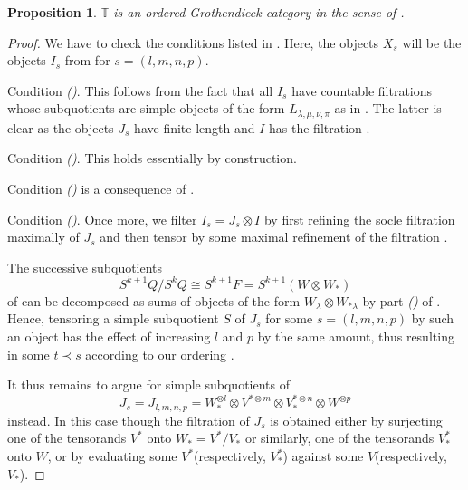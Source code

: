 \documentclass[11pt]{article}
\theoremstyle{plain}
\newtheorem{proposition}[lemma]{Proposition}
\theoremstyle{nonumberplain}
\theoremstyle{plain}
\numberwithin{equation}{section}
\theoremstyle{nonumberplain}
\newtheorem{proof}{Proof}
\newcommand\bT{{\mathbb T}}
\newcommand\cP{{\mathcal P}}
\newcommand\cS{{\mathcal S}}
\newcommand\1{{\bf 1}}
\begin{document}
\begin{proposition}\label{pr.is-ordered}
$\bT$ is an ordered Grothendieck category in the sense of .   
\end{proposition}
\begin{proof}
  We have to check the conditions listed in . Here, the objects $X_s$ will be the objects $I_s$ from  for $s=(l,m,n,p)$.

  {Condition \emph{()}.} This follows from the fact that all $I_s$ have countable filtrations whose subquotients are simple objects of the form $L_{\lambda,\mu,\nu,\pi}$ as in . The latter is clear as the objects $J_s$ have finite length and $I$ has the filtration .


  {Condition \emph{()}.} This holds essentially by construction. 

  {Condition \emph{()}} is a consequence of \cite[Proposition 4.4]{us0}.  

  {Condition \emph{()}.} Once more, we filter $I_s=J_s\otimes I$ by first refining the socle filtration maximally of $J_s$ and then tensor by some maximal refinement of the filtration . %

  The successive subquotients
  \begin{equation*}
    S^{k+1}Q/S^kQ \cong S^{k+1}F= S^{k+1}(W\otimes W_*)
  \end{equation*}
  of  can be decomposed as sums of objects of the form $W_{\lambda}\otimes W_{*\lambda}$ by part \emph{()} of . Hence, tensoring a simple subquotient $S$
  of $J_s$ for some $s=(l,m,n,p)$ by such an object has the effect of increasing $l$ and $p$ by the same amount, thus resulting in some $t\prec s$ according to our ordering .

  It thus remains to argue for simple subquotients of
  \begin{equation*}
    J_s=J_{l,m,n,p}=W_*^{\otimes l}\otimes V^{*\otimes m}\otimes V_*^{*\otimes n}\otimes W^{\otimes p}
  \end{equation*}
  instead. In this case though the filtration of $J_s$ is obtained either by surjecting one of the tensorands $V^*$ onto $W_*=V^*/V_*$ or similarly, one of the tensorands $V_*^*$ onto $W$, or by evaluating some $V^{*}$(respectively, $ V_{*}^{*} $) against some $V$(respectively, $ V_{*} $).


\end{proof}
\end{document}

